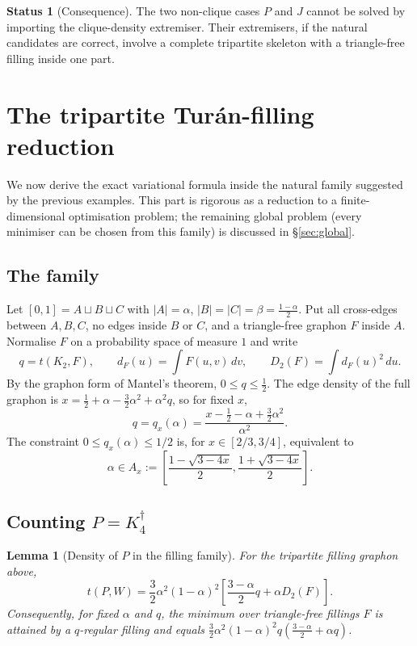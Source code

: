 \documentclass[11pt]{amsart}
\newtheorem{lemma}[theorem]{Lemma}
\theoremstyle{definition}
\newtheorem{status}[theorem]{Status}
\newcommand{\1}{\mathbf 1}
\newcommand{\dd}{\,d}
\begin{document}
\begin{status}[Consequence]
The two non-clique cases $P$ and $J$ cannot be solved by importing the
clique-density extremiser.  Their extremisers, if the natural candidates are
correct, involve a complete tripartite skeleton with a triangle-free filling
inside one part.
\end{status}

\section{The tripartite Tur\'an-filling reduction}
\label{sec:filling}

We now derive the exact variational formula inside the natural family suggested
by the previous examples.  This part is rigorous as a reduction to a
finite-dimensional optimisation problem; the remaining global problem (every
minimiser can be chosen from this family) is discussed in \S\ref{sec:global}.

\subsection{The family}

Let $[0,1]=A\sqcup B\sqcup C$ with $|A|=\alpha$, $|B|=|C|=\beta=\frac{1-\alpha}{2}$.
Put all cross-edges between $A,B,C$, no edges inside $B$ or $C$, and a
triangle-free graphon $F$ inside $A$.  Normalise $F$ on a probability space of
measure $1$ and write
\[
   q=t(K_2,F),
   \qquad d_F(u)=\int F(u,v)\dd v,
   \qquad D_2(F)=\int d_F(u)^2\dd u.
\]
By the graphon form of Mantel's theorem, $0\le q\le \frac12$.  The edge density
of the full graphon is $x=\frac12+\alpha-\frac32\alpha^2+\alpha^2q$, so for
fixed $x$,
\[
   q=q_x(\alpha)=\frac{x-\frac12-\alpha+\frac32\alpha^2}{\alpha^2}.
\]
The constraint $0\le q_x(\alpha)\le 1/2$ is, for $x\in[2/3,3/4]$, equivalent to
\[
   \alpha\in A_x:=\left[
      \frac{1-\sqrt{3-4x}}2,
      \frac{1+\sqrt{3-4x}}2
   \right].
\]

\subsection{Counting $P=K_4^\dagger$}

\begin{lemma}[Density of $P$ in the filling family]
For the tripartite filling graphon above,
\[
   t(P,W)=\frac32\alpha^2(1-\alpha)^2
          \left[
             \frac{3-\alpha}{2}q+\alpha D_2(F)
          \right].
\]
Consequently, for fixed $\alpha$ and $q$, the minimum over triangle-free
fillings $F$ is attained by a $q$-regular filling and equals
$\frac32\alpha^2(1-\alpha)^2q\left(\frac{3-\alpha}{2}+\alpha q\right)$.
\end{lemma}
\end{document}
